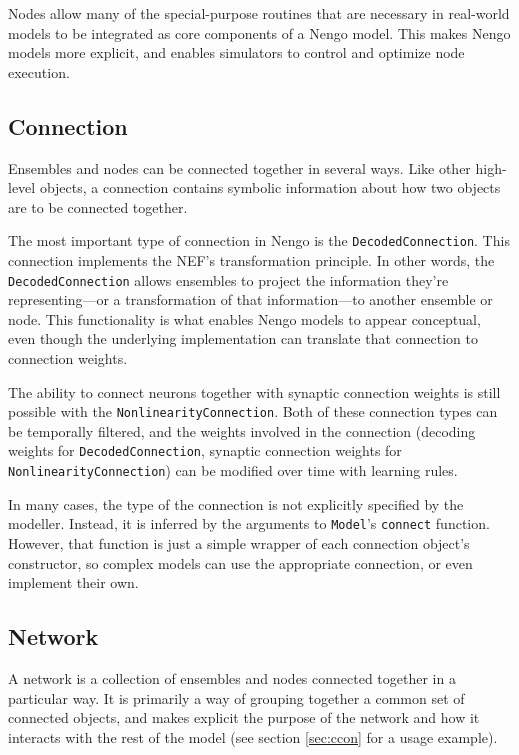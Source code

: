 \documentclass{frontiersSCNS}
\begin{document}
Nodes allow many of the special-purpose
routines that are necessary in real-world
models to be integrated
as core components of a Nengo model.
This makes Nengo models more explicit,
and enables simulators
to control and optimize node execution.

\subsection{Connection}

Ensembles and nodes can be connected together
in several ways.
Like other high-level objects,
a connection contains symbolic information
about how two objects are to be connected together.

The most important type of connection
in Nengo is the \texttt{DecodedConnection}.
This connection implements
the NEF's transformation principle.
In other words, the \texttt{DecodedConnection}
allows ensembles to project
the information they're representing---or
a transformation of that information---to
another ensemble or node.
This functionality is what enables Nengo models
to appear conceptual,
even though the underlying implementation
can translate that connection
to connection weights.

The ability to connect neurons together
with synaptic connection weights is still possible
with the \texttt{NonlinearityConnection}.
Both of these connection types
can be temporally filtered,
and the weights involved in the connection
(decoding weights for \texttt{DecodedConnection},
synaptic connection weights for \texttt{NonlinearityConnection})
can be modified over time with learning rules.

In many cases, the type of the connection
is not explicitly specified by the modeller.
Instead, it is inferred by the arguments
to \texttt{Model}'s \texttt{connect} function.
However, that function is just a simple wrapper
of each connection object's constructor,
so complex models can use
the appropriate connection,
or even implement their own.

\subsection{Network}

A network is a collection of ensembles and nodes
connected together in a particular way.
It is primarily a way of grouping together
a common set of connected objects,
and makes explicit the purpose
of the network and how it interacts
with the rest of the model
(see section \ref{sec:ccon} for a usage example).
\end{document}
